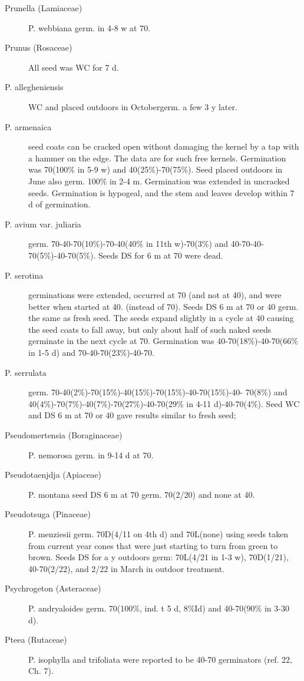 \begin{description}
\item[Prunella (Lamiaceae)] P. webbiana germ. in 4-8 w at 70.
\item[Prunus (Rosaceae)] All seed was WC for 7 d.
\item[P. allegheniensis] WC and placed outdoors in Octobergerm. a few 3 y later.
\item[P. armenaica] seed coats can be cracked open without damaging the kernel by
a tap with a hammer on the edge. The data are for such free kernels. Germination
was 70(100\% in 5-9 w) and 40(25\%)-70(75\%). Seed placed outdoors in June also
germ. 100\% in 2-4 m. Germination was extended in uncracked seeds. Germination is
hypogeal, and the stem and leaves develop within 7 d of germination.
\item[P. avium var. juliaria] germ. 70-40-70(10\%)-70-40(40\% in 11th w)-70(3\%) and
40-70-40-70(5\%)-40-70(5\%). Seeds DS for 6 m at 70 were dead.
\item[P. serotina] germinations were extended, occurred at 70 (and not at 40), and
were better when started at 40. (instead of 70). Seeds DS 6 m at 70 or 40 germ. the
same as fresh seed. The seeds expand slightly in a cycle at 40 causing the seed
coats to fall away, but only about half of such naked seeds germinate in the next cycle
at 70. Germination was 40-70(18\%)-40-70(66\% in 1-5 d) and 70-40-70(23\%)-40-70.
\item[P. serrulata] germ. 70-40(2\%)-70(15\%)-40(15\%)-70(15\%)-40-70(15\%)-40-
70(8\%) and 40(4\%)-70(7\%)-40(7\%)-70(27\%)-40-70(29\% in 4-11 d)-40-70(4\%). Seed
WC and DS 6 m at 70 or 40 gave results similar to fresh seed;

\item[Pseudomertensia (Boraginaceae)] P. nemorosa germ. in 9-14 d at 70.
\item[Pseudotaenjdja (Apiaceae)] P. montana seed DS 6 m at 70 germ.
70(2/20) and none at 40.
\item[Pseudotsuga (Pinaceae)] P. menziesii germ. 70D(4/11 on 4th d) and
70L(none) using seeds taken from current year cones that were just starting to turn
from green to brown. Seeds DS for a y outdoors germ: 70L(4/21 in 1-3 w), 70D(1/21),
40-70(2/22), and 2/22 in March in outdoor treatment.

\item[Psychrogeton (Asteraceae)] P. andryaloides germ. 70(100\%, ind. t 5 d,
8\%Id) and 40-70(90\% in 3-30 d).

\item[Pteea (Rutaceae)] P. isophylla and trifoliata were reported to be 40-70
germinators (ref. 22, Ch. 7).


\end{description}
